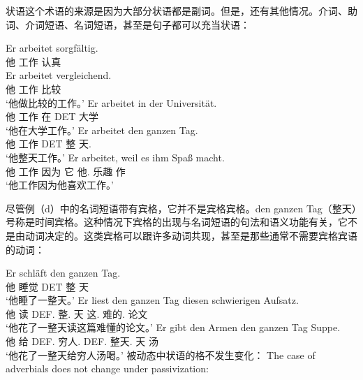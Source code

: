 状语这个术语的来源是因为大部分状语都是副词。但是，还有其他情况。介词、助词、介词短语、名词短语，甚至是句子都可以充当状语：

\eal
\ex 
\gll Er arbeitet sorgfältig.\\
	 他 工作 认真\\
\ex 
\gll Er arbeitet vergleichend.\\
	 他 工作 比较\\
\glt `他做比较的工作。'
\ex 
\gll Er arbeitet in der Universität.\\
	 他 工作 在 DET 大学\\
\glt `他在大学工作。'
\ex 
\gll Er arbeitet den ganzen Tag.\\
     他 工作 DET 整 天.\acc\\
\glt `他整天工作。'
\ex 
\gll Er arbeitet, weil es ihm Spaß macht.\\
	 他 工作 因为 它 他.\dat{} 乐趣 作\\
\glt `他工作因为他喜欢工作。'
\zl

\addlines[2]
\noindent
尽管例（d）中的名词短语带有宾格，它并不是宾格宾格。den ganzen Tag（整天）号称是时间宾格。这种情况下宾格的出现与名词短语的句法和语义功能有关，它不是由动词决定的。这类宾格可以跟许多动词共现，甚至是那些通常不需要宾格宾语的动词：

\eal
\ex 
\gll Er schläft den ganzen Tag.\\
     他 睡觉 DET 整 天\\
\glt `他睡了一整天。'
\ex 
\gll Er liest den ganzen Tag diesen schwierigen Aufsatz.\\
	 他 读 DEF.\acc{} 整.\acc{} 天 这.\acc{} 难的.\acc{} 论文\\
\glt `他花了一整天读这篇难懂的论文。'
\ex 
\gll Er gibt den Armen den ganzen Tag Suppe.\\
	 他 给 DEF.\dat{} 穷人.\dat{} DEF.\acc{} 整天.\acc{} 天 汤\\
\glt `他花了一整天给穷人汤喝。'
\zl
被动态中状语的格不发生变化：
The case of adverbials does not change under passivization:
\eal
{}
\zl
{}

